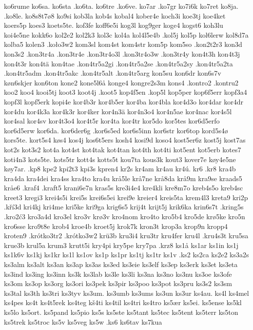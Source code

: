 {{ko6rume
ko6sa.
ko6sta
.ko6ta.
ko6tre
.ko6ve.
ko7ar
.ko7gr
ko7i6k
ko7ret
ko8ja.
.ko8le.
ko8s8t7ø8
ko9si
kob3la
kob4s
kobal4
kober4e
koch3i
koe3tj
koe4ket
koers5p
koes3
koets5te.
kof3fe
koff6e5i
kog3l
kog9ger
koge4
kogst6
koh3lu
koi4e5ne
kokk6o
kol2e2
kol2k3
kol3c
kol4a
kol4l5e4b
.kol5j
kol5p
kol6lerw
kol8d7a
kolba5
kolen3
.koło3w2
kom3sl
kom4st
kom4str
kom5p
kom5so
.kon2t2r3
kon3d
kon3s2
.kon3tr4a
.kon3tr4e
.kon3tr4o3l
.kon3tr4o3w
.kon3tr4y
kon4t3h
kon4t3j
kon4t3r
kon4tä
kon4tae
.kon4tr5a2gi
.kon4tr5a2se
.kon4tr5a2sy
.kon4tr5a2ta
.kon4tr5adm
.kon4tr5akc
.kon4tr5alt
.kon4tr5arg
kon5su
kon6dr
kon6s7v
køn6skjer
kon6ton
kone2
kone5l6å
konge4
kongre2s3m
kons4
.kontro2
.kontru2
koo2
koo4
kooi5tj
koot3
koot4j
.koot5
kop4f5en
.kop5l
kop5per
kop6f5err
kopf3a4
kopf3l
kopf5erk
kopi4e
kor4b3r
kor4b5er
kor4ba
kor4bla
kor4d3o
kor4dar
kor4dr
kor4du
kor4k3a
kor4k3r
kor4ker
kor4n3ä
kor4n3o4
kor4n5ae
kor4nac
kor4s5l
kor4sal
kor4sv
kor4t3o4
kor4t5r
kor4ta
kor4tr
kor5do
kor5tes
kor6d5erfo
kor6d5erw
kor6da.
kor6der6g
.kor6s5ed
kor6s5inn
kor6str
kor6top
kord5s4ø
kors5te.
kort5s4
køs4
kos4j
kos6t5ers
kosh4
kosi9d
koso4
kost5er6z
kost5j
kost7as
kot2s
kot3s2
kot4a
kot4st
kot4tak
kot4tan
kot4th
kot4ti
kot5ent
kot5erb
kotes7
koti4n3
kots5te.
kots5tr
kott4s
kotts5t
kou7ta
kous3k
kout3
kover7e
køy4e5ne
køy7ar.
.kp8
kpe2
kpi2t3
kpi3s
kpren4
kr2s
kr4am
kr4au
kr4ú.
kr6
.kr8
kra4b
kra4da
kra4dei
kra4ss
kra4to
kra4u
krå5le
krå7ne
krå8da
krå9m
kra9se
kraads5
kråe6
.kraf4
.kraft5
krani6e7n
kras5s
kre3i4e4
kre4kli
kre8m7o
kreb4s5o
kreb4sc
kreet3
kregi3
krei4s5i
krei5s
krei6s5ei
krei9e
kreier4
kreis5ta
krem4l3
kreta9
kri2p
.kří3d
kri4kj
kri4me
kri5ke
kri9ga
krig6s5
krij4t
krijt5j
krik6ka
krin6s7t
.kring5s
.kro2ć3
kro3a4d
kro3el
kro3v
krø3v
kro4nom
kro4to
kro5b4
kro5de
krø5ke
kro5n
kro6sse
kro9t8e
krob4
kroe4b
kroet5j
krok7k
kron3t
krop3a
krop9n
kropp4
kroten9
.krótko3tr2
.krótko3w2
krü3b
kru3i4
kru3tr
kru4fer
kru4l
.kru4s3t
kru5sa
krue3b
krul5a
krum3
krutt5i
kry4pi
kry5pe
kry7pa
.krz8
ks1å
ks1ar
ks1in
ks1j
ks1k6v
ks1kj
ks1kr
ks1l
ks1ov
ks1p
ks1pr
ks1tj
ks1tr
ks1v
.ks2
ks2ca
ks2e2
ks3a2s
ks3alm
ks3alt
ks3an
ks3ap
ks3as
ks3ed
ks3eie
ks3elf
ks3ep
ks3erk
ks3et
ks3eta
ks3ind
ks3ing
ks3inn
ks3k
ks3lab
ks3le
ks3li
ks3na
ks3no
ks3nu
ks3oe
ks3ofe
ks3om
ks3op
ks3org
ks3ori
ks3pek
ks3pir
ks3poo
ks3pot
ks3pru
ks3s2
ks3sm
ks3tal
ks3th
ks3tri
ks3tyv
ks3um.
ks3umb
ks3ums
ks3un
ks3ur
ks4au.
ks4l
ks4mel
ks4pes
ks4t
ks4t5rek
ks4teg
kš4ti
ks4til
ks4tri
ks4tro
ks5ær
ks5ei.
ks5ense
ks5kl
ks5lo
ks5ort.
ks5pand
ks5pio
ks5s
ks5ste
ks5tant
ks5tec
ks5tent
ks5terr
ks5ton
ks5trek
ks5troc
ks5v
ks5veg
ks5w
.ks6
ks6tav
ks7kua
}}
